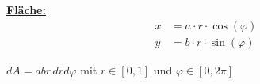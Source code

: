     \begin{minipage}{0.49\linewidth}
        \textbf{\underline{Fläche:}}
            \begin{align*}
                x &= a \cdot r \cdot \cos(\varphi)\\
                y &= b \cdot r \cdot \sin(\varphi)
            \end{align*}
    \end{minipage}
    \begin{minipage}{0.5\linewidth}
        \vskip4pt
        $dA = abr \, dr d\varphi$
        \vskip4pt
        mit $r \in \left[0, 1\right]$ und $\varphi \in \left[0, 2\pi\right]$
    \end{minipage}
        